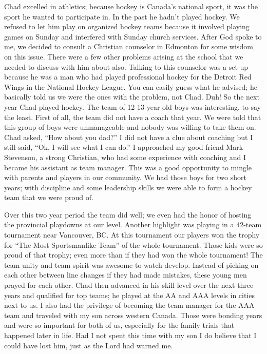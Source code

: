 \documentclass[oneside]{book}
\begin{document}
Chad excelled in athletics; because hockey is Canada's national sport, it was the sport he wanted to participate in. In the past he hadn't played hockey. We refused to let him play on organized hockey teams because it involved playing games on Sunday and interfered with Sunday church services. After God spoke to me, we decided to consult a Christian counselor in Edmonton for some wisdom on this issue. There were a few other problems arising at the school that we needed to discuss with him about also. Talking to this counselor was a set-up because he was a man who had played professional hockey for the Detroit Red Wings in the National Hockey League. You can easily guess what he advised; he basically told us we were the ones with the problem, not Chad. Duh! So the next year Chad played hockey. The team of 12-13 year old boys was interesting, to say the least. First of all, the team did not have a coach that year. We were told that this group of boys were unmanageable and nobody was willing to take them on. Chad asked, “How about you dad?” I did not have a clue about coaching but I still said, “Ok, I will see what I can do.” I approached my good friend Mark Stevenson, a strong Christian, who had some experience with coaching and I became his assistant as team manager. This was a good opportunity to mingle with parents and players in our community. We had those boys for two short years; with discipline and some leadership skills we were able to form a hockey team that we were proud of.

Over this two year period the team did well; we even had the honor of hosting the provincial playdowns at our level. Another highlight was playing in a 42-team tournament near Vancouver, BC. At this tournament our players won the trophy for “The Most Sportsmanlike Team” of the whole tournament. Those kids were so proud of that trophy; even more than if they had won the whole tournament! The team unity and team spirit was awesome to watch develop. Instead of picking on each other between line changes if they had made mistakes, these young men prayed for each other. Chad then advanced in his skill level over the next three years and qualified for top teams; he played at the AA and AAA levels in cities next to us. I also had the privilege of becoming the team manager for the AAA team and traveled with my son across western Canada. Those were bonding years and were so important for both of us, especially for the family trials that happened later in life. Had I not spent this time with my son I do believe that I could have lost him, just as the Lord had warned me.
\end{document}
